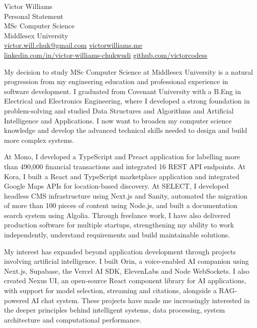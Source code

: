 \documentclass[11pt,a4paper]{article}
\begin{document}
\begin{center}
{\Large Victor Williams}\\[0.4em]
Personal Statement\\[0.15em]
MSc Computer Science\\
Middlesex University\\[0.4em]
{\small
\href{mailto:victor.will.chuk@gmail.com}{victor.will.chuk@gmail.com}
\quad
\href{https://www.victorwilliams.me/}{victorwilliams.me}\\[0.15em]
\href{https://www.linkedin.com/in/victor-williams-chukwudi/}{linkedin.com/in/victor-williams-chukwudi}
\quad
\href{https://github.com/victorcodess}{github.com/victorcodess}
}
\end{center}

\vspace{0.2em}

My decision to study MSc Computer Science at Middlesex University is a natural progression from my engineering education and professional experience in software development. I graduated from Covenant University with a B.Eng in Electrical and Electronics Engineering, where I developed a strong foundation in problem-solving and studied Data Structures and Algorithms and Artificial Intelligence and Applications. I now want to broaden my computer science knowledge and develop the advanced technical skills needed to design and build more complex systems.

At Mono, I developed a TypeScript and Preact application for labelling more than 490,000 financial transactions and integrated 16 REST API endpoints. At Kora, I built a React and TypeScript marketplace application and integrated Google Maps APIs for location-based discovery. At SELECT, I developed headless CMS infrastructure using Next.js and Sanity, automated the migration of more than 100 pieces of content using Node.js, and built a documentation search system using Algolia. Through freelance work, I have also delivered production software for multiple startups, strengthening my ability to work independently, understand requirements and build maintainable solutions.

My interest has expanded beyond application development through projects involving artificial intelligence. I built Orin, a voice-enabled AI companion using Next.js, Supabase, the Vercel AI SDK, ElevenLabs and Node WebSockets. I also created Nexus UI, an open-source React component library for AI applications, with support for model selection, streaming and citations, alongside a RAG-powered AI chat system. These projects have made me increasingly interested in the deeper principles behind intelligent systems, data processing, system architecture and computational performance.
\end{document}

